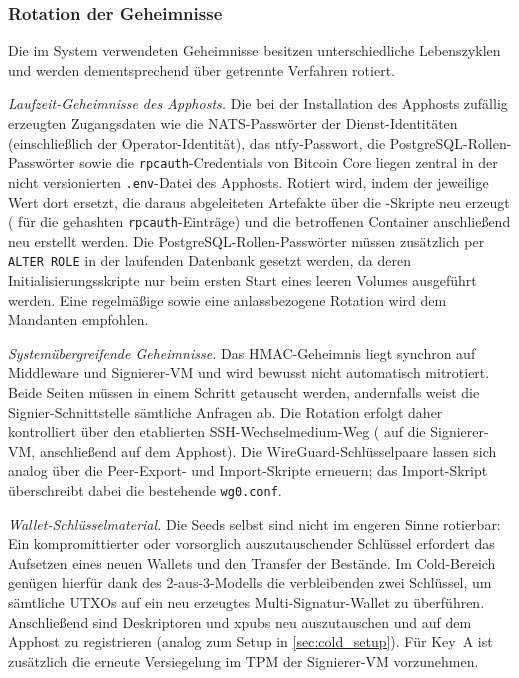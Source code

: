 \subsubsection{Rotation der Geheimnisse}
Die im System verwendeten Geheimnisse besitzen unterschiedliche Lebenszyklen und werden dementsprechend über getrennte Verfahren rotiert.

\emph{Laufzeit-Geheimnisse des Apphosts.} Die bei der Installation des Apphosts zufällig erzeugten Zugangsdaten wie die \ac{NATS}-Passwörter der Dienst-Identitäten (einschließlich der Operator-Identität), das ntfy-Passwort, die PostgreSQL-Rollen-Passwörter sowie die \texttt{rpcauth}-Credentials von Bitcoin Core liegen zentral in der nicht versionierten \texttt{.env}-Datei des Apphosts. Rotiert wird, indem der jeweilige Wert dort ersetzt, die daraus abgeleiteten Artefakte über die -Skripte neu erzeugt ( für die gehashten \texttt{rpcauth}-Einträge) und die betroffenen Container anschließend neu erstellt werden. Die PostgreSQL-Rollen-Passwörter müssen zusätzlich per \texttt{ALTER ROLE} in der laufenden Datenbank gesetzt werden, da deren Initialisierungsskripte nur beim ersten Start eines leeren Volumes ausgeführt werden. Eine regelmäßige sowie eine anlassbezogene Rotation wird dem Mandanten empfohlen.

\emph{Systemübergreifende Geheimnisse.} Das \ac{HMAC}-Geheimnis liegt synchron auf Middleware und Signierer-\ac{VM} und wird bewusst nicht automatisch mitrotiert.
Beide Seiten müssen in einem Schritt getauscht werden, andernfalls weist die Signier-Schnittstelle sämtliche Anfragen ab. Die Rotation erfolgt daher kontrolliert über den etablierten \ac{SSH}-Wechselmedium-Weg ( auf die Signierer-\ac{VM}, anschließend  auf dem Apphost). Die WireGuard-Schlüsselpaare lassen sich analog über die Peer-Export- und Import-Skripte erneuern; das Import-Skript überschreibt dabei die bestehende \texttt{wg0.conf}.

\emph{Wallet-Schlüsselmaterial.} Die Seeds selbst sind nicht im engeren Sinne rotierbar: Ein kompromittierter oder vorsorglich auszutauschender Schlüssel erfordert das Aufsetzen eines neuen Wallets und den Transfer der Bestände. Im Cold-Bereich genügen hierfür dank des 2-aus-3-Modells die
verbleibenden zwei Schlüssel, um sämtliche \acp{UTXO} auf ein neu erzeugtes Multi-Signatur-Wallet zu überführen.
Anschließend sind Deskriptoren und \acp{xpub} neu auszutauschen und auf dem Apphost zu registrieren (analog zum Setup in \ref{sec:cold_setup}). Für Key~A ist zusätzlich die erneute Versiegelung im \ac{TPM} der Signierer-\ac{VM} vorzunehmen.

